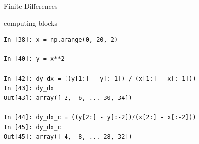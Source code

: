 \begin{frame}[fragile]
Finite Differences
 \begin{block}{computing blocks}
   \begin{verbatim}
In [38]: x = np.arange(0, 20, 2)

In [40]: y = x**2

In [42]: dy_dx = ((y[1:] - y[:-1]) / (x[1:] - x[:-1]))
In [43]: dy_dx
Out[43]: array([ 2,  6, ... 30, 34])

In [44]: dy_dx_c = ((y[2:] - y[:-2])/(x[2:] - x[:-2]))
In [45]: dy_dx_c
Out[45]: array([ 4,  8, ... 28, 32])
\end{verbatim}
\end{block}
\end{frame}


